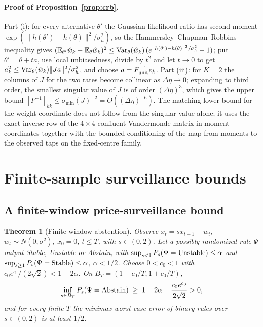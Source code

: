 \documentclass[12pt]{article}
\newtheorem{theorem}{Theorem}[section]
\theoremstyle{definition}
\theoremstyle{remark}
\newcommand{\E}{\mathbb{E}}
\begin{document}
\paragraph{Proof of Proposition~\ref{prop:crb}.}
 Part (i): for every alternative $\theta'$ the Gaussian likelihood ratio has second moment $\exp(\|h(\theta')-h(\theta)\|^2/\sigma_h^2)$, so the Hammersley--Chapman--Robbins inequality gives $(\E_{\theta'}\hat w_k-\E_\theta\hat w_k)^2\le{\rm Var}_\theta(\hat w_k)\,(e^{\|h(\theta')-h(\theta)\|^2/\sigma_h^2}-1)$; put $\theta'=\theta+ta$, use local unbiasedness, divide by $t^2$ and let $t\to0$ to get $a_k^2\le{\rm Var}_\theta(\hat w_k)\|Ja\|^2/\sigma_h^2$, and choose $a=F_{\rm unit}^{-1}e_k$. Part (iii): for $K=2$ the columns of $J$ for the two rates become collinear as $\Delta\eta\to0$; expanding to third order, the smallest singular value of $J$ is of order $(\Delta\eta)^3$, which gives the upper bound $[F^{-1}]_{kk}\le\sigma_{\min}(J)^{-2}=O((\Delta\eta)^{-6})$. The matching lower bound for the weight coordinate does not follow from the singular value alone; it uses the exact inverse row of the $4\times4$ confluent Vandermonde matrix in moment coordinates together with the bounded conditioning of the map from moments to the observed taps on the fixed-centre family.


\section{Finite-sample surveillance bounds}\label{app:restored_finite}

\subsection{A finite-window price-surveillance bound}

\begin{theorem}[Finite-window abstention]\label{thm:abstain}
Observe $x_t=sx_{t-1}+w_t$, $w_t\sim N(0,\sigma^2)$, $x_0=0$, $t\le T$, with $s\in(0,2)$. Let a possibly randomized rule $\Psi$ output Stable, Unstable or Abstain, with $\sup_{s<1}P_s(\Psi={\rm Unstable})\le\alpha$ and $\sup_{s\ge1}P_s(\Psi={\rm Stable})\le\alpha$, $\alpha<1/2$. Choose $0<c_0<1$ with $c_0e^{c_0}/(2\sqrt2)<1-2\alpha$. On $B_T=(1-c_0/T,1+c_0/T)$,
\[
\inf_{s\in B_T}P_s(\Psi={\rm Abstain})\;\ge\;1-2\alpha-\frac{c_0e^{c_0}}{2\sqrt2}>0 ,
\]
and for every finite $T$ the minimax worst-case error of binary rules over $s\in(0,2)$ is at least $1/2$.
\end{theorem}
\end{document}
